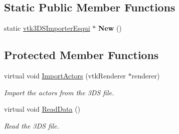 \subsection*{Static Public Member Functions}
\begin{DoxyCompactItemize}
\item 
\hypertarget{classvtk3DSImporterEsqui_afada25b424cd38f8c228cf4b0b48dad5}{
static \hyperlink{classvtk3DSImporterEsqui}{vtk3DSImporterEsqui} $\ast$ {\bfseries New} ()}
\label{classvtk3DSImporterEsqui_afada25b424cd38f8c228cf4b0b48dad5}

\end{DoxyCompactItemize}
\subsection*{Protected Member Functions}
\begin{DoxyCompactItemize}
\item 
\hypertarget{classvtk3DSImporterEsqui_a2dee0907769f78409ce82547755236f9}{
virtual void \hyperlink{classvtk3DSImporterEsqui_a2dee0907769f78409ce82547755236f9}{ImportActors} (vtkRenderer $\ast$renderer)}
\label{classvtk3DSImporterEsqui_a2dee0907769f78409ce82547755236f9}

\begin{DoxyCompactList}\small\item\em Import the actors from the 3DS file. \item\end{DoxyCompactList}\item 
\hypertarget{classvtk3DSImporterEsqui_ab7107d9273a215b46b8d57f818a8e5e4}{
virtual void \hyperlink{classvtk3DSImporterEsqui_ab7107d9273a215b46b8d57f818a8e5e4}{ReadData} ()}
\label{classvtk3DSImporterEsqui_ab7107d9273a215b46b8d57f818a8e5e4}

\begin{DoxyCompactList}\small\item\em Read the 3DS file. \item\end{DoxyCompactList}\end{DoxyCompactItemize}
